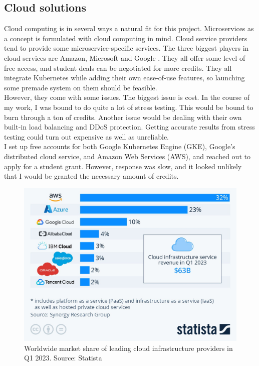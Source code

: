 \subsection{Cloud solutions}
Cloud computing is in several ways a natural fit for this project. Microservices as a concept is formulated with cloud computing in mind. Cloud service providers tend to provide some microservice-specific services. 
The three biggest players in cloud services are Amazon, Microsoft and Google \cite*{DgtlInfra}. They all offer some level of free access, and student deals can be negotiated for more credits. They all integrate Kubernetes while adding their own ease-of-use features, so launching some premade system on them should be feasible. \\
However, they come with some issues. The biggest issue is cost. In the course of my work, I was bound to do quite a lot of stress testing. This would be bound to burn through a ton of credits. Another issue would be dealing with their own built-in load balancing and DDoS protection. Getting accurate results from stress testing could turn out expensive as well as unreliable.\\
I set up free accounts for both Google Kubernetes Engine (GKE), Google's distributed cloud service, and Amazon Web Services (AWS), and reached out to apply for a student grant. However, response was slow, and it looked unlikely that I would be granted the necessary amount of credits.

\begin{figure} 
\centering 
\includegraphics[width=\columnwidth]{Figures/Graphs/Cloud_market_share.jpeg}
\caption{Worldwide market share of leading cloud infrastructure providers in Q1 2023. Source: Statista}
\label{Cloud market share}
\end{figure}

